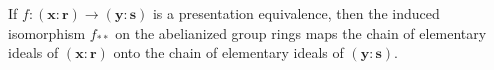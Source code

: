 If $f: (\mathbf{x} : \mathbf{r}) \to (\mathbf{y} : \mathbf{s})$ is a presentation equivalence, then the induced isomorphism $f_{**}$ on the abelianized group rings maps the chain of elementary ideals of $(\mathbf{x} : \mathbf{r})$ onto the chain of elementary ideals of $(\mathbf{y} : \mathbf{s})$.
